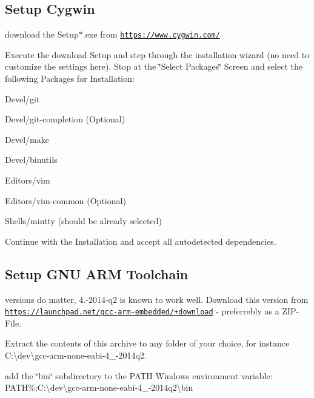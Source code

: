 \subsection*{Setup Cygwin}

download the Setup$\ast$.exe from \href{https://www.cygwin.com/}{\tt https\+://www.\+cygwin.\+com/}



Execute the download Setup and step through the installation wizard (no need to customize the settings here). Stop at the \char`\"{}\+Select Packages\char`\"{} Screen and select the following Packages for Installation\+:


\begin{DoxyItemize}
\item Devel/git
\item Devel/git-\/completion (Optional)
\item Devel/make
\item Devel/binutils
\item Editors/vim
\item Editors/vim-\/common (Optional)
\item Shells/mintty (should be already selected)
\end{DoxyItemize}











Continue with the Installation and accept all autodetected dependencies.



\subsection*{Setup G\+N\+U A\+R\+M Toolchain}





versions do matter, 4.-\/2014-\/q2 is known to work well. Download this version from \href{https://launchpad.net/gcc-arm-embedded/+download}{\tt https\+://launchpad.\+net/gcc-\/arm-\/embedded/+download} -\/ preferrebly as a Z\+I\+P-\/\+File.

Extract the contents of this archive to any folder of your choice, for instance {\ttfamily C\+:\textbackslash{}dev\textbackslash{}gcc-\/arm-\/none-\/eabi-\/4\+\_-\/2014q2}.



add the \char`\"{}bin\char`\"{} subdirectory to the P\+A\+T\+H Windows environment variable\+: {\ttfamily P\+A\+T\+H\%;C\+:\textbackslash{}dev\textbackslash{}gcc-\/arm-\/none-\/eabi-\/4\+\_-\/2014q2\textbackslash{}bin}





